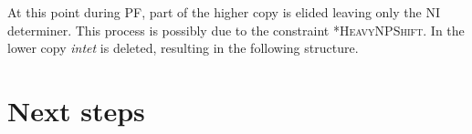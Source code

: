 \documentclass[12pt, letterpaper]{article}
\begin{document}
\ex At this point during PF, part of the higher copy is elided leaving only the NI determiner. This process is possibly due to the constraint *\textsc{HeavyNPShift}. In the lower copy \emph{intet} is deleted, resulting in the following structure.
\ea {}
	\z
\z 


\section{Next steps} \label{sec:NEXT}
\begin{itemize}

\end{itemize}



\printbibliography[heading=bibintoc]
\end{document}
